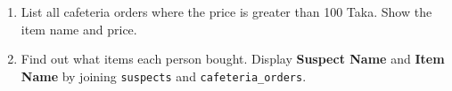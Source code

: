 \documentclass[12pt,a4paper]{article}
\begin{document}
\begin{enumerate}


    \item List all cafeteria orders where the price is greater than 100 Taka. Show the item name and price.






    \item Find out what items each person bought. Display \textbf{Suspect Name} and \textbf{Item Name} by joining \texttt{suspects} and \texttt{cafeteria\_orders}.


\end{enumerate}
\end{document}
